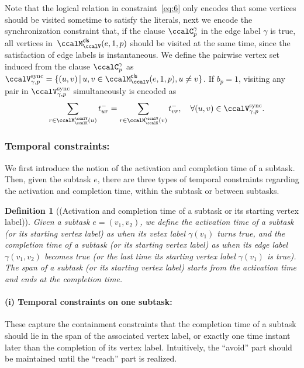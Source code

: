 \documentclass[Afour,sageh,times]{sagej}
\newtheorem{defn}[thm]{Definition}
\begin{document}
{{{    Note that the logical relation in constraint~\eqref{eq:6} only encodes that some vertices should be visited sometime to satisfy the literals, next we encode the synchronization constraint that, if the clause $\ccalC_p^\gamma$ in the edge label $\gamma$ is true, all vertices in~$\ccalM^\mathsf{cls}_\ccalV(e, 1,p)$ should be visited at the same time, since the satisfaction of edge labels is instantaneous.
      We define the pairwise vertex set induced from the clause $\ccalC_p^\gamma$ as  $\ccalV_{\gamma, p}^{\text{sync}} = \{(u,v)\,|\, u, v\in \ccalM^\mathsf{cls}_\ccalV(e,1,p), u\not= v \}$. If $b_p=1$, visiting any pair in $\ccalV_{\gamma, p}^{\text{sync}}$ simultaneously is encoded as
\begingroup\makeatletter\def\f@size{10}\check@mathfonts
\def\maketag@@@#1{\hbox{\m@th\normalsize\normalfont#1}}%
\begin{align}
  & \quad\quad  \sum_{r\in \ccalM^\ccalV_{\ccalK}(u)} t_{ur}^-  = \sum_{r\in \ccalM^\ccalV_{\ccalK}(v)} t_{vr}^- , \quad\forall (u,v) \in \ccalV_{\gamma, p}^{\text{sync}}.\label{eq:7}
\end{align}
\endgroup





\subsubsection{Temporal constraints:}\label{sec:temporal} We first introduce the notion of the activation and completion time of a subtask. Then, given the subtask $e$, there are three types of temporal constraints regarding the activation and completion time,  within the subtask or between subtasks.
\begin{defn}[(Activation and completion time of a subtask or its starting vertex label)]
Given a subtask $e = (v_1, v_2)$, we define the  activation time of a subtask (or its starting  vertex label) as when its vetex label $\gamma(v_1)$ turns true, and the completion time  of a subtask (or its starting vertex label) as when its edge label $\gamma(v_1, v_2)$ becomes true (or the last time its starting vertex label $\gamma(v_1)$ is true). The span of a subtask (or its starting vertex label) starts from the activation time and ends at the completion time.
\end{defn}
\paragraph{(i) Temporal constraints on one subtask:}\label{sec:onesubtask} These capture the containment constraints that the completion time of a subtask should lie in the span of the associated vertex label, or exactly one time instant later than the completion of its vertex label. Intuitively, the ``avoid'' part should be maintained until the ``reach'' part is realized.

}}}
\end{document}
